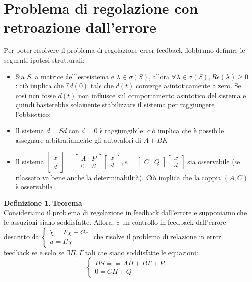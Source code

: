 \documentclass{article}
\theoremstyle{definition}
\newtheorem{definition}{\textbf{Definizione}}
\begin{document}
\section*{Problema di regolazione con retroazione dall'errore}
Per poter risolvere il problema di regolazione error feedback dobbiamo definire le seguenti ipotesi strutturali:\begin{itemize}
    \item Sia \(S\) la matrice dell'esosistema e \(\lambda\in\sigma{(S)}\), allora \(\forall\lambda\in\sigma{(S)},Re(\lambda)\geq 0\): ciò implica che \(\nexists d(0) \) tale che \(d(t)\) converge asintoticamente a zero. Se così non fosse \(d(t)\) non influisce sul comportamento asintotico del sistema e quindi basterebbe solamente stabilizzare il sistema per raggiungere l'obbiettico;
    \item Il sistema \(\dot{d}=Sd\) con \(d=0\) è raggiungibile: ciò implica che è possibile assegnare arbitrariamente gli autovalori di \(A+BK\)
    \item Il sistema \(\begin{bmatrix}
        \dot{x}\\\dot{d}
    \end{bmatrix}=\begin{bmatrix}
        A & P \\ 0 &S
    \end{bmatrix}\begin{bmatrix}
        x\\ d
    \end{bmatrix}, e=\begin{bmatrix}
        C & Q
    \end{bmatrix}\begin{bmatrix}
        x\\d
    \end{bmatrix}
    \) sia osservabile (se rilassato va bene anche la determinabilità). Ciò implica che la coppia \((A,C)\) è osservabile.
\end{itemize}
\begin{definition}{\textbf{Teorema}}\\
    Consideriamo il problema di regolazione in feedback dall'errore e supponiamo che le assuzioni siano soddisfatte. Allora, \(\exists \) un controllo in feedback dall'errore descritto da:\(\begin{cases}
        \dot{\chi }=F\chi+Ge\\
        u=H\chi
    \end{cases}\) che risolve il problema di relazione in error feedback se e solo se \(\exists \Pi,\Gamma \) tali che siano soddisfatte le equazioni:
    \begin{equation*}
        \begin{cases}
            \Pi S==A\Pi+B\Gamma+P\\
            0=C\Pi+Q
        \end{cases}
    \end{equation*}
\end{definition}
\end{document}
